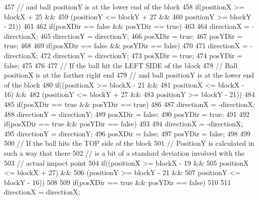 \begin{DoxyCode}
{{{{457                 // and ball positionY is at the lower end of the block
458                 if(positionX >= blockX + 25 &&
459                    (positionY <= blockY + 27 &&
460                     positionY >= blockY - 21))
461                 {
462                     if(posXDir == false && posYDir == true)
463                     {
464                         directionX = -directionX;
465                         directionY = directionY;
466                         posXDir = true;
467                         posYDir = true;
468                     }
469                     if(posXDir == false && posYDir == false)
470                     {
471                         directionX = -directionX;
472                         directionY = directionY;
473                         posXDir = true;
474                         posYDir = false;
475                     }
476                 }
477                 // If the ball hit the LEFT SIDE of the block
478                 // Ball positionX is at the farther right end
479                 // and ball positionY is at the lower end of the block
480                 if((positionX >= blockX - 21 &&
481                     positionX <= blockX - 16) &&
482                    (positionY <= blockY + 27 &&
483                     positionY >= blockY - 21))
484                 {
485                     if(posXDir == true && posYDir == true)
486                     {
487                         directionX = -directionX;
488                         directionY = directionY;
489                         posXDir = false;
490                         posYDir = true;
491                     }
492                     if(posXDir == true && posYDir == false)
493                     {
494                         directionX = -directionX;
495                         directionY = directionY;
496                         posXDir = false;
497                         posYDir = false;
498                     }
499                 }
500                 // If the ball hits the TOP side of the block
501                 // PositionY is calculated in such a way that there
502                 // is a bit of a standard deviation involved with the
503                 // actual impact point
504                 if((positionX >= blockX - 19 &&
505                     positionX <= blockX + 27) &&
506                    (positionY >= blockY - 21 &&
507                     positionY <= blockY - 16))
508                 {
509                     if(posXDir == true && posYDir == false)
510                     {
511                         directionX = directionX;
}}}}}}
\end{DoxyCode}

